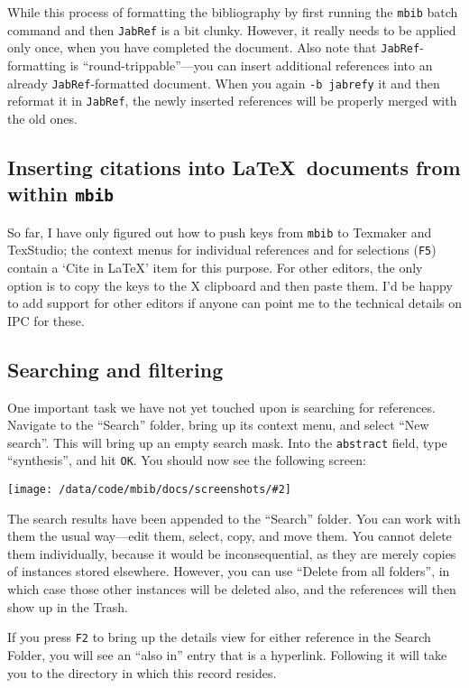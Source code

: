 \documentclass[10pt]{article}
\newcommand*{\mbib}{\texttt{mbib}\xspace}
\newcommand*{\jabref}{\texttt{JabRef}\xspace}
\newcommand*{\key}[1]{\texttt{#1}\xspace}
\newcommand{\screenshot}[2][]{%
\medskip\par
\begin{center}
\texttt{[image: /data/code/mbib/docs/screenshots/\#2]}
\end{center}}
\begin{document}
While this process of formatting the bibliography by first running the \mbib batch command and then \jabref is a bit clunky. However, it really needs to be applied only once, when you have completed the document. Also note that \jabref{}-formatting is ``round-trippable''---you can insert additional references into an already \jabref-formatted document. When you again \texttt{-b jabrefy} it and then reformat it in \jabref, the newly inserted references will be properly merged with the old ones. 

\subsection{Inserting citations into \LaTeX\ documents from within \mbib}

So far, I have only figured out how to push keys from \mbib to Texmaker and TexStudio; the context menus for individual references and for selections (\key{F5}) contain a `Cite in LaTeX' item for this purpose. For other editors, the only option is to copy the keys to the X clipboard and then paste them. I'd be happy to add support for other editors if anyone can point me to the technical details on IPC for these.

\subsection{Searching and filtering}
\label{sec-searching}

One important task we have not yet touched upon is searching for references. Navigate to the ``Search'' folder, bring up its context menu, and select ``New search''. This will bring up an empty search mask. Into the \texttt{abstract} field, type ``synthesis'', and hit \texttt{OK}. You should now see the following screen:

\screenshot[clip,trim=0 1.2in 0 0]{search-results}

\noindent The search results have been appended to the ``Search'' folder. You can work with them the usual way---edit them, select, copy, and move them. You cannot delete them individually, because it would be inconsequential, as they are merely copies of instances stored elsewhere. However, you can use ``Delete from all folders'', in which case those other instances will be deleted also, and the references will then show up in the Trash. 

If you press \key{F2} to bring up the details view for either reference in the Search Folder, you will see an ``also in''
%
\label{pg-also-in}%
%
entry that is a hyperlink. Following it will take you to the directory in which this record resides. 
\end{document}
